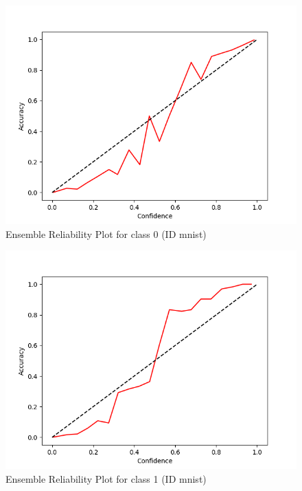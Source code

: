 \documentclass[11pt]{article}
\begin{document}
\begin{figure}[htbp]
\centering
\includegraphics[width=.9\linewidth]{./ens_mnist_rel_0.png}
\caption{\label{fig:org304bcac}
Ensemble Reliability Plot for class 0 (ID mnist)}
\end{figure}

\begin{figure}[htbp]
\centering
\includegraphics[width=.9\linewidth]{./ens_mnist_rel_1.png}
\caption{\label{fig:org371cd14}
Ensemble Reliability Plot for class 1 (ID mnist)}
\end{figure}
\end{document}
